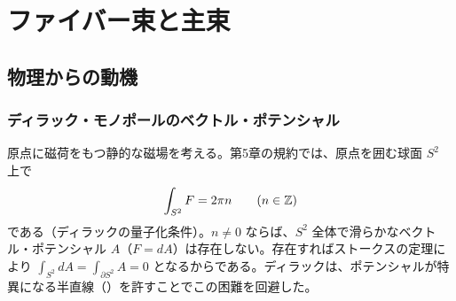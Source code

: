 \chapter{ファイバー束と主束}\label{ch:07}

\section{物理からの動機}

\subsection*{ディラック・モノポールのベクトル・ポテンシャル}
原点に磁荷をもつ静的な磁場を考える。第5章の規約では、原点を囲む球面 $S^2$ 上で
\[
\int_{S^2}F=2\pi n\qquad(n\in\mathbb{Z})
\]
である（ディラックの量子化条件）。$n\neq0$ ならば、$S^2$ 全体で滑らかなベクトル・ポテンシャル $A$（$F=dA$）は存在しない。存在すればストークスの定理により $\int_{S^2}dA=\int_{\partial S^2}A=0$ となるからである。ディラックは、ポテンシャルが特異になる半直線（）を許すことでこの困難を回避した。

